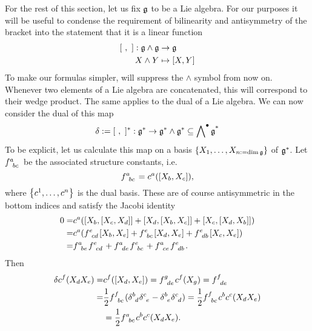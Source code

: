 For the rest of this section, let us fix $\mathfrak{g}$ to be a Lie algebra. For our purposes it will be useful to condense the requirement of bilinearity and antisymmetry of the bracket into the statement that it is a linear function
\begin{equation}
\begin{aligned}
\left[~,~\right]:\mathfrak{g}\wedge\mathfrak{g}&\rightarrow\mathfrak{g}\\
X\wedge Y&\mapsto[X,Y]
\end{aligned}
\end{equation}
To make our formulas simpler, will suppress the $\wedge$ symbol from now on. Whenever two elements of a Lie algebra are concatenated, this will correspond to their wedge product. The same applies to the dual of a Lie algebra. We can now consider the dual of this map
\begin{equation}
\delta:=[~,~]^*:\mathfrak{g}^*\rightarrow\mathfrak{g}^*\wedge\mathfrak{g}^*\subseteq\operatorname{\bigwedge\nolimits^\bullet\mathfrak{g}^*}
\end{equation}
To be explicit, let us calculate this map on a basis $\qty{X_1,\dots,X_{n:=\dim\mathfrak{g}}}$ of $\mathfrak{g}^*$. Let $f\indices{^a_{bc}}$ be the associated structure constants, i.e.
\begin{equation}
f\indices{^a_{bc}}=c^a([X_b,X_c]),
\end{equation} 
where $\qty{c^1,\dots,c^n}$ is the dual basis. These are of course antisymmetric in the bottom indices and satisfy the Jacobi identity
\begin{equation}
\begin{aligned}
0=&c^a([X_b,[X_c,X_d]]+[X_d,[X_b,X_c]]+[X_c,[X_d,X_b]])\\
=&c^a(f\indices{^e_{cd}}[X_b,X_e]+f\indices{^e_{bc}}[X_d,X_e]+f\indices{^e_{db}}[X_c,X_e])\\
=&f\indices{^a_{be}}f\indices{^e_{cd}}+f\indices{^a_{de}}f\indices{^e_{bc}}+f\indices{^a_{ce}}f\indices{^e_{db}}.  
\end{aligned}
\end{equation} 
Then
\begin{equation}\label{eq:brst_lie_coordinates}
\begin{aligned}
\delta c^f(X_d X_e)=&c^f([X_d,X_e])=f\indices{^g_{de}}c^f(X_g)=f\indices{^f_{de}}\\
=&\frac{1}{2}f\indices{^f_{bc}}(\delta\indices{^b_d}\delta\indices{^c_e}-\delta\indices{^b_e}\delta\indices{^c_d})=\frac{1}{2}f\indices{^f_{bc}}c^bc^c(X_dX_e)\\
&=\frac{1}{2}f\indices{^a_{bc}}c^bc^c(X_dX_e).
\end{aligned}
\end{equation}

